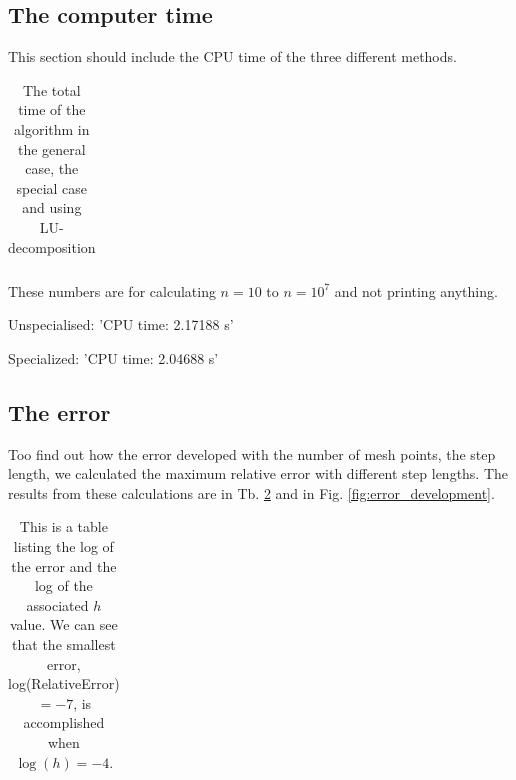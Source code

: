\subsection{The computer time}

This section should include the CPU time of the three different methods.



\begin{table}[H]

\begin{tabular}{|c|c|c|c|c|c|}
	\hline
	
	\hline
\end{tabular}
\caption{The total time of the algorithm in the general case, the special case and using LU-decomposition}\label{tab:time}
\end{table}





\hspace{1cm}\linebreak

These numbers are for calculating $n = 10$ to $n = 10^7$ and not printing anything.

Unspecialised: 'CPU time: 2.17188 s'

Specialized: 'CPU time: 2.04688 s'

\subsection{The error}

Too find out how the error developed with the number of mesh points, the step length, we calculated the maximum relative error with different step lengths. The results from these calculations are in Tb. \ref{tab:error_developement} and in Fig. \ref{fig:error_development}. 

\begin{table}[H]\caption{This is a table listing the log of the error and the log of the associated $h$ value. We can see that the smallest error, log(RelativeError) $= -7$, is accomplished when $\log(h) = -4$.}\label{tab:error_developement}
\begin{tabular}{cc}

\end{tabular}
\end{table}

